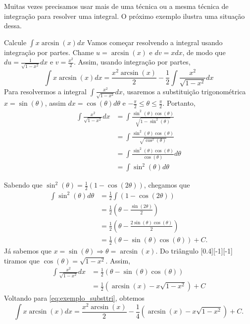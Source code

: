 Muitas vezes precisamos usar mais de uma técnica ou a mesma técnica
de integração para resolver uma integral. O próximo exemplo ilustra
uma situação dessa.

\begin{example}
  Calcule \(\int x \arcsin(x) dx\)
  \solution
  Vamos começar resolvendo a integral usando integração por partes.
  Chame $u=\arcsin(x)$ e $dv=xdx$, de modo que
  $du=\frac{1}{\sqrt{1-x^2}}dx$ e $v=\frac{x^2}{2}$.
  Assim, usando integração por partes,
  \begin{equation}
    \label{eq:exemplo_substtri}
    \int x \arcsin(x) dx
    = \frac{x^2 \arcsin(x)}{2}-\frac{1}{2}\int \frac{x^2}{\sqrt{1-x^2}}dx
  \end{equation}
  Para resolvermos a integral $\int \frac{x^2}{\sqrt{1-x^2}}dx$,
  usaremos a substituição trigonométrica $x=\sin(\theta)$,
  assim $dx=\cos(\theta)d\theta$ e
  $-\frac{\pi}{2} \leq \theta \leq \frac{\pi}{2}$.
  Portanto,
  \begin{align*}
    \int \frac{x^2}{\sqrt{1-x^2}}dx
    & = \int \frac{\sin^2(\theta)\cos(\theta)}{\sqrt{1-\sin^2(\theta)}} \\
    & = \int \frac{\sin^2(\theta)\cos(\theta)}{\sqrt{\cos^2(\theta)}} \\
    & = \int \frac{\sin^2(\theta)\cos(\theta)}{\cos(\theta)} d \theta \\
    & = \int \sin^2(\theta) d \theta
  \end{align*}

  Sabendo que $\sin^2(\theta)= \frac{1}{2}(1-\cos(2 \theta))$,
  chegamos que
  \begin{align*}
    \int \sin^2(\theta) d \theta
    & = \frac{1}{2}\int(1-\cos(2 \theta)) \\
    & = \frac{1}{2}(\theta -\frac{\sin(2\theta)}{2}) \\
    & = \frac{1}{2}(\theta -\frac{2\sin(\theta)\cos(\theta)}{2})  \\
    & = \frac{1}{2}(\theta -\sin(\theta)\cos(\theta)) +C.
  \end{align*}
  Já sabemos que $x=\sin(\theta) \Rightarrow \theta=\arcsin(x)$.
  Do triângulo
  [0.4][-1][-1]
  tiramos que $\cos(\theta)= \sqrt{1-x^2}$.
  Assim,
  \begin{align*}
    \int \frac{x^2}{\sqrt{1-x^2}}dx
    & =\frac{1}{2}(\theta -\sin(\theta)\cos(\theta)) \\
    & =\frac{1}{2}(\arcsin(x)-x\sqrt{1-x^2})+C
  \end{align*}
  Voltando para \eqref{eq:exemplo_substtri}, obtemos
  \[
    \int x \arcsin(x) dx
    = \frac{x^2\arcsin(x)}{2}-\frac{1}{4}(\arcsin(x)-x\sqrt{1-x^2})+C.
  \]
\end{example}


